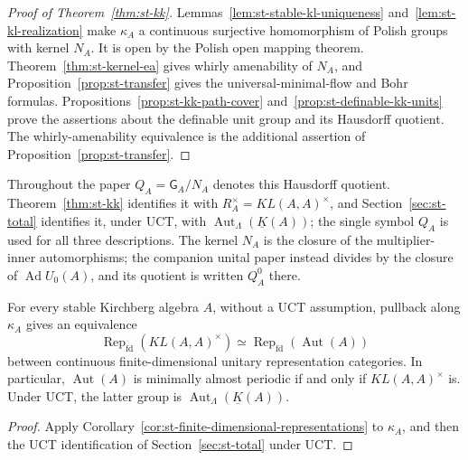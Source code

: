 \begin{proof}[Proof of Theorem~\protect\ref{thm:st-kk}]
Lemmas~\ref{lem:st-stable-kl-uniqueness} and~\ref{lem:st-kl-realization} make $\kappa_A$ a continuous surjective homomorphism of Polish groups with kernel $N_A$. It is open by the Polish open mapping theorem. Theorem~\ref{thm:st-kernel-ea} gives whirly amenability of $N_A$, and
Proposition~\ref{prop:st-transfer} gives the universal-minimal-flow and Bohr
formulas. Propositions~\ref{prop:st-kk-path-cover} and~\ref{prop:st-definable-kk-units} prove the assertions
about the definable unit group and its Hausdorff quotient.
The whirly-amenability equivalence is the additional assertion of
Proposition~\ref{prop:st-transfer}.
\end{proof}

Throughout the paper $Q_A=\mathsf G_A/N_A$ denotes this Hausdorff
quotient. Theorem~\ref{thm:st-kk} identifies it with
$R_A^\times=KL(A,A)^\times$, and Section~\ref{sec:st-total} identifies it,
under UCT, with $\operatorname{Aut}_\Lambda(\underline K(A))$; the single symbol $Q_A$
is used for all three descriptions. The kernel $N_A$ is the closure of
the multiplier-inner automorphisms; the companion unital paper
\cite{LupiniUnital2026} instead divides by the closure of
$\operatorname{Ad} U_0(A)$, and its quotient is written $Q_A^0$ there.

\begin{corollary}\label{cor:st-kirchberg-fd-representations}
 For every stable Kirchberg algebra $A$, without a UCT assumption, pullback along $\kappa_A$ gives an equivalence 
\begin{equation*}
\operatorname{Rep}_{\mathrm{fd}}(KL(A,A)^\times)  \simeq  \operatorname{Rep}_{\mathrm{fd}}(\operatorname{Aut}(A)) 
\end{equation*}
between continuous finite-dimensional unitary representation categories. In
particular, $\operatorname{Aut}(A)$ is minimally almost periodic if and only if $KL(A,A)^\times$ is. Under UCT, the latter group is $\operatorname{Aut}_\Lambda(\underline
K(A))$.
\end{corollary}

\begin{proof}
Apply Corollary~\ref{cor:st-finite-dimensional-representations} to $\kappa_A$,
and then the UCT identification of Section~\ref{sec:st-total} under UCT.
\end{proof}

